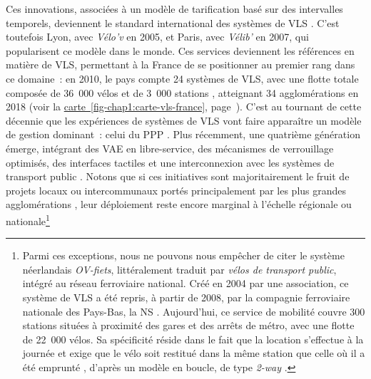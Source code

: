 \begin{refsegment}
Ces innovations, associées à un modèle de tarification basé sur des intervalles temporels, deviennent le standard international des systèmes de \acrshort{VLS} \textcolor{blue}{\autocite[162]{shaheen_bikesharing_2010}}. C’est toutefois Lyon, avec \textsl{Vélo'v} en 2005, et Paris, avec \textsl{Vélib'} en 2007, qui popularisent ce modèle dans le monde. Ces services deviennent les références en matière de \acrshort{VLS}, permettant à la France de se positionner au premier rang dans ce domaine~: en 2010, le pays compte 24 systèmes de \acrshort{VLS}, avec une flotte totale composée de 36~000 vélos et de 3~000 stations \textcolor{blue}{\autocite[161]{shaheen_bikesharing_2010}}, atteignant 34 agglomérations en 2018 (voir la \hyperref[fig-chap1:carte-vls-france]{carte~\ref{fig-chap1:carte-vls-france}}, page~\pageref{fig-chap1:carte-vls-france}). C'est au tournant de cette décennie que les expériences de systèmes de \acrshort{VLS} vont faire apparaître un modèle de gestion dominant~: celui du \acrfull{PPP} \textcolor{blue}{\autocite[5]{hure_entre_2014}}. Plus récemment, une quatrième génération émerge, intégrant des \acrshort{VAE} en libre-service, des mécanismes de verrouillage optimisés, des interfaces tactiles et une interconnexion avec les systèmes de transport public \textcolor{blue}{\autocite[162]{shaheen_bikesharing_2010}}. Notons que si ces initiatives sont majoritairement le fruit de projets locaux ou intercommunaux portés principalement par les plus grandes agglomérations \textcolor{blue}{\autocites[18]{fishman_bike_2013}[6]{ricci_bike_2015}}, leur déploiement reste encore marginal à l’échelle régionale ou nationale\footnote{
    Parmi ces exceptions, nous ne pouvons nous empêcher de citer le système néerlandais \textsl{OV-fiets}, littéralement traduit par \textsl{vélos de transport public}, intégré au réseau ferroviaire national. Créé en 2004 par une association, ce système de \acrshort{VLS} a été repris, à partir de 2008, par la compagnie ferroviaire nationale des Pays-Bas, la \acrfull{NS} \textcolor{blue}{\autocites[151]{ploeger_sociotechnical_2020}[157]{waes_why_2020}}. Aujourd’hui, ce service de mobilité couvre 300 stations situées à proximité des gares et des arrêts de métro, avec une flotte de 22~000 vélos. Sa spécificité réside dans le fait que la location s’effectue à la journée et exige que le vélo soit restitué dans la même station que celle où il a été emprunté \textcolor{blue}{\autocite[9]{ploeger_sociotechnical_2020}}, d'après un modèle en boucle, de type \textsl{2-way} \textcolor{blue}{\autocite[13]{mangeart_vehicules_2022}}.
}
\end{refsegment}
